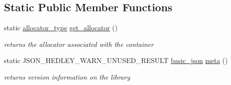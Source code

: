 \subsection*{Static Public Member Functions}
\begin{DoxyCompactItemize}
\item 
static \hyperlink{classnlohmann_1_1basic__json_a86ce930490cf7773b26f5ef49c04a350}{allocator\+\_\+type} \hyperlink{classnlohmann_1_1basic__json_af4ac14224fbdd29d3547fcb11bb55c8f}{get\+\_\+allocator} ()
\begin{DoxyCompactList}\small\item\em returns the allocator associated with the container \end{DoxyCompactList}\item 
static J\+S\+O\+N\+\_\+\+H\+E\+D\+L\+E\+Y\+\_\+\+W\+A\+R\+N\+\_\+\+U\+N\+U\+S\+E\+D\+\_\+\+R\+E\+S\+U\+LT \hyperlink{classnlohmann_1_1basic__json}{basic\+\_\+json} \hyperlink{classnlohmann_1_1basic__json_a677318a34ade7f8177a2784c06aa3671}{meta} ()
\begin{DoxyCompactList}\small\item\em returns version information on the library \end{DoxyCompactList}\end{DoxyCompactItemize}
